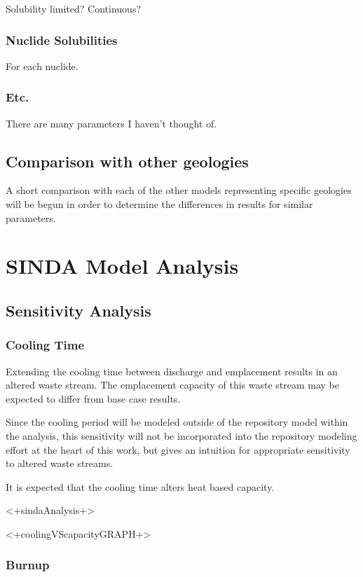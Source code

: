 Solubility limited? Continuous?

\subsubsection{Nuclide Solubilities}

For each nuclide.

\subsubsection{Etc. }

There are many parameters I haven't thought of.

\subsection{Comparison with other geologies}

A short comparison with each of the other models representing specific geologies 
will be begun in order to determine the differences in results for similar 
parameters.


\section{SINDA Model Analysis}
\subsection{Sensitivity Analysis}
\subsubsection{Cooling Time}

Extending the cooling time between discharge and emplacement results
in an altered waste stream. The emplacement capacity
of this waste stream may be expected to differ from base case results. 

Since the cooling period will be modeled outside of the repository model within  
the \Cyclus analysis, this sensitivity will not be incorporated into the 
repository modeling effort at the heart of this work, but gives an intuition for 
appropriate sensitivity to altered waste streams.

It is expected that the cooling time alters heat based capacity. 

<+sindaAnalysis+>

<+coolingVScapacityGRAPH+>

\subsubsection{Burnup}

